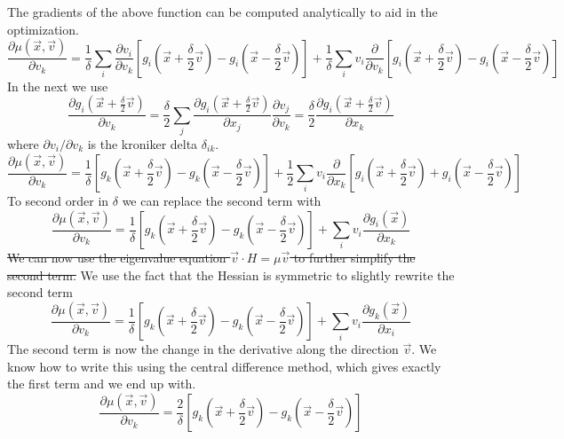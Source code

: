 \documentclass[a4paper]{article}
\begin{document}
The gradients of the above function can be computed analytically to aid in the
optimization.
\begin{equation}
\frac{\partial \mu(\vec{x}, \vec{v})} {\partial v_k} = 
\frac{1}{\delta} 
\sum_i \frac{\partial v_i}{\partial v_k}
\left[ g_i(\vec{x} + \frac{\delta}{2} \vec{v}) 
- g_i(\vec{x} - \frac{\delta}{2} \vec{v}) \right]
+
\frac{1}{ \delta} 
\sum_i v_i
\frac{\partial}{\partial v_k}
\left[ g_i(\vec{x} + \frac{\delta}{2} \vec{v}) 
- g_i(\vec{x} - \frac{\delta}{2} \vec{v}) \right]
\end{equation}
In the next we use
\begin{equation}
\frac{\partial g_i(\vec{x} + \frac{\delta}{2} \vec{v})}{ \partial v_k} 
= 
\frac{\delta}{2} \sum_j
\frac{\partial g_i(\vec{x} + \frac{\delta}{2} \vec{v})}{ \partial x_j}
\frac{\partial  v_j} { \partial v_k}
= \frac{\delta}{2} 
\frac{\partial g_i(\vec{x} + \frac{\delta}{2} \vec{v})}{ \partial x_k} 
\end{equation}
where $\partial v_i / \partial v_k$ is the kroniker delta $\delta_{ik}$.
\begin{equation}
\frac{\partial \mu(\vec{x}, \vec{v})} {\partial v_k} = 
\frac{1}{\delta} 
\left[ g_k(\vec{x} + \frac{\delta}{2} \vec{v}) 
- g_k(\vec{x} - \frac{\delta}{2} \vec{v}) \right]
+
\frac{1}{2} 
\sum_i v_i
\frac{\partial}{\partial x_k}
\left[ g_i(\vec{x} + \frac{\delta}{2} \vec{v}) 
+ g_i(\vec{x} - \frac{\delta}{2} \vec{v}) \right]
\end{equation}
To second order in $\delta$ we can replace the second term with
\begin{equation}
\frac{\partial \mu(\vec{x}, \vec{v})} {\partial v_k} = 
\frac{1}{\delta} 
\left[ g_k(\vec{x} + \frac{\delta}{2} \vec{v}) 
- g_k(\vec{x} - \frac{\delta}{2} \vec{v}) \right]
+
\sum_i v_i
\frac{\partial g_i(\vec{x})}{\partial x_k}
\end{equation}
\sout{We can now use the eigenvalue equation $\vec{v} \cdot H = \mu \vec{v}$ to further simplify the second term.}
We use the fact that the Hessian is symmetric to slightly rewrite the second term
\begin{equation}
\frac{\partial \mu(\vec{x}, \vec{v})} {\partial v_k} = 
\frac{1}{\delta} 
\left[ g_k(\vec{x} + \frac{\delta}{2} \vec{v}) 
- g_k(\vec{x} - \frac{\delta}{2} \vec{v}) \right]
+
\sum_i v_i
\frac{\partial g_k(\vec{x})}{\partial x_i}
\end{equation}
The second term is now the change in the derivative along the direction $\vec{v}$.  We know how to write this using the central difference method, which gives exactly the first term and we end up with.
\begin{equation}
\frac{\partial \mu(\vec{x}, \vec{v})} {\partial v_k} = 
\frac{2}{\delta} 
\left[ g_k(\vec{x} + \frac{\delta}{2} \vec{v}) 
- g_k(\vec{x} - \frac{\delta}{2} \vec{v}) \right]
\end{equation}
\end{document}
